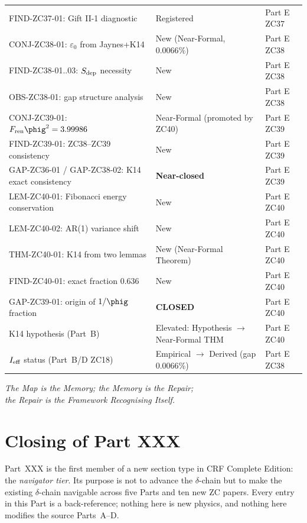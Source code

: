 \documentclass[12pt, a4paper]{article}
\begin{document}
{\begin{longtable}{>{\raggedright\arraybackslash}p{6.4cm}
                  >{\centering\arraybackslash}p{2.6cm}
                  >{\raggedright\arraybackslash}p{3.6cm}}
FIND-ZC37-01: Gift II-1 diagnostic & Registered & Part E ZC37 \\
CONJ-ZC38-01: $\varepsilon_0$ from Jaynes+K14 & New (Near-Formal, $0.0066\%$) & Part E ZC38 \\
FIND-ZC38-01..03: $S_{\rm dep}$ necessity & New & Part E ZC38 \\
OBS-ZC38-01: gap structure analysis & New & Part E ZC38 \\
CONJ-ZC39-01: $F_{\rm ren}\phig^2 = 3.99986$ & Near-Formal (promoted by ZC40) & Part E ZC39 \\
FIND-ZC39-01: ZC38--ZC39 consistency & New & Part E ZC39 \\
GAP-ZC36-01 / GAP-ZC38-02: K14 exact consistency & \textbf{Near-closed} & Part E ZC39 \\
LEM-ZC40-01: Fibonacci energy conservation & New & Part E ZC40 \\
LEM-ZC40-02: AR(1) variance shift & New & Part E ZC40 \\
THM-ZC40-01: K14 from two lemmas & New (Near-Formal Theorem) & Part E ZC40 \\
FIND-ZC40-01: exact fraction $0.636$ & New & Part E ZC40 \\
GAP-ZC39-01: origin of $1/\phig$ fraction & \textbf{CLOSED} & Part E ZC40 \\
K14 hypothesis (Part~B) & Elevated: Hypothesis $\to$ Near-Formal THM & Part E ZC40 \\
$I_{\rm eff}$ status (Part~B/D ZC18) & Empirical $\to$ Derived (gap $0.0066\%$) & Part E ZC38 \\
\end{longtable}
}

\vspace{1ex}

\bigskip

\begin{center}
\textit{The Map is the Memory; the Memory is the Repair;}\\
\textit{the Repair is the Framework Recognising Itself.}
\end{center}

\section*{Closing of Part XXX}

Part~XXX is the first member of a new section type in CRF Complete
Edition: the \emph{navigator tier}. Its purpose is not to advance
the $\delta$-chain but to make the existing $\delta$-chain
navigable across five Parts and ten new ZC papers. Every entry in
this Part is a back-reference; nothing here is new physics, and
nothing here modifies the source Parts~A--D.
\end{document}

